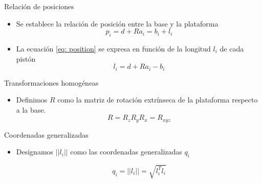 \documentclass{beamer}
\begin{document}
\begin{frame}{Relación de posiciones}

\begin{itemize}
 \item Se establece la relación de posición entre la base y la plataforma\\
 \begin{equation}
  p_i = d + Ra_i = b_i + l_i
  \label{eq: position}
 \end{equation}
 \item La ecuación \ref{eq: position} se expresa en función de la longitud $l_i$ de cada pistón
 \begin{equation}
  l_i = d + Ra_i - b_i
 \end{equation}
\end{itemize}

\end{frame}

\begin{frame}{Transformaciones homogéneas}
\begin{itemize}
 \item Definimos $R$ como la matriz de rotación extrínseca de la plataforma respecto a la base. \\
 \begin{equation}
R = R_zR_yR_x = R_{xyz}
\end{equation}
\end{itemize}
\end{frame}

\begin{frame}{Coordenadas generalizadas}
 \begin{itemize}
  \item Designamos $||l_i||$ como las coordenadas generalizadas $q_i$
  
  \begin{equation}\label{eq_coordgral}
q_i = ||l_i|| = \sqrt{l_i^Tl_i}
\end{equation}
  
 \end{itemize}

\end{frame}
\end{document}
